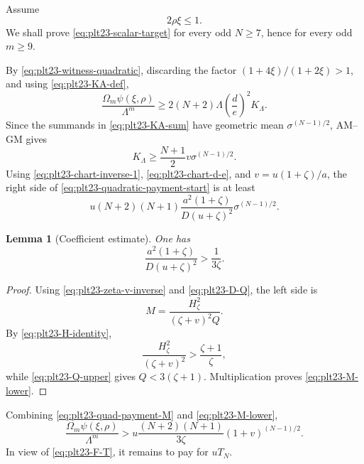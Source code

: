\documentclass[11pt]{article}
\newtheorem{lemma}[theorem]{Lemma}
\numberwithin{equation}{section}
\begin{document}
Assume
\begin{equation}\label{eq:plt23-quadratic-branch}
  2\rho\xi\le1.
\end{equation}
We shall prove \eqref{eq:plt23-scalar-target} for every odd $N\ge7$, hence for every odd $m\ge9$.

By \eqref{eq:plt23-witness-quadratic}, discarding the factor $(1+4\xi)/(1+2\xi)>1$, and using \eqref{eq:plt23-KA-def},
\begin{equation}\label{eq:plt23-quadratic-payment-start}
  \frac{\Omega_m\psi(\xi,\rho)}{\Lambda^m}
  \ge2(N+2)\Lambda\left(\frac {d}{e}\right)^2K_\Lambda.
\end{equation}
Since the summands in \eqref{eq:plt23-KA-sum} have geometric mean $\sigma^{(N-1)/2}$, AM--GM gives
\begin{equation}\label{eq:plt23-KA-AMGM}
  K_\Lambda\ge\frac{N+1}{2}
  v\sigma^{(N-1)/2}.
\end{equation}
Using \eqref{eq:plt23-chart-inverse-1}, \eqref{eq:plt23-chart-d-e}, and $v=u(1+\zeta)/a$, the right side of \eqref{eq:plt23-quadratic-payment-start} is at least
\begin{equation}\label{eq:plt23-quad-payment-M}
  u(N+2)(N+1)
  \frac{a^2(1+\zeta)}{D(u+\zeta)^2}
  \sigma^{(N-1)/2}.
\end{equation}

\begin{lemma}[Coefficient estimate]\label{lem:plt23-quad-coeff}
  One has
  \begin{equation}\label{eq:plt23-M-lower}
    \frac{a^2(1+\zeta)}{D(u+\zeta)^2}
    >\frac{1}{3\zeta}.
  \end{equation}
\end{lemma}

\begin{proof}
  Using \eqref{eq:plt23-zeta-v-inverse} and \eqref{eq:plt23-D-Q}, the left side is
  \[
    M=\frac{H_\zeta^2}{(\zeta+v)^2Q}.
  \]
  By \eqref{eq:plt23-H-identity},
  \[
    \frac{H_\zeta^2}{(\zeta+v)^2}
    >\frac{\zeta+1}{\zeta},
  \]
  while \eqref{eq:plt23-Q-upper} gives $Q<3(\zeta+1)$.
  Multiplication proves \eqref{eq:plt23-M-lower}.
\end{proof}

Combining \eqref{eq:plt23-quad-payment-M} and \eqref{eq:plt23-M-lower},
\begin{equation}\label{eq:plt23-quad-payment-final}
  \frac{\Omega_m\psi(\xi,\rho)}{\Lambda^m}
  >u\frac{(N+2)(N+1)}{3\zeta}
  (1+v)^{(N-1)/2}.
\end{equation}
In view of \eqref{eq:plt23-F-T}, it remains to pay for $uT_N$.
\end{document}
